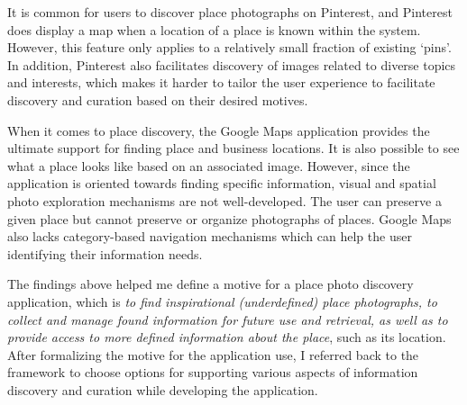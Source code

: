 {It is common for users to discover place photographs on Pinterest, and Pinterest does display a map when a location of a place is known within the system. However, this feature only applies to a relatively small fraction of existing `pins'. In addition, Pinterest also facilitates discovery of images related to diverse topics and interests, which makes it harder to tailor the user experience to facilitate discovery and curation based on their desired motives. 

When it comes to place discovery, the Google Maps application provides the ultimate support for finding place and business locations. It is also possible to see what a place looks like based on an associated image. However, since the application is oriented towards finding specific information, visual and spatial photo exploration mechanisms are not well-developed. The user can preserve a given place but cannot preserve or organize photographs of places. Google Maps also lacks category-based navigation mechanisms which can help the user identifying their information needs.  

The findings above helped me define a motive for a place photo discovery application, which is \textit{to find inspirational (underdefined) place photographs, to collect and manage found information for future use and retrieval, as well as to provide access to more defined information about the place}, such as its location. After formalizing the motive for the application use, I referred back to the framework to choose options for supporting various aspects of information discovery and curation while developing the application.
}

